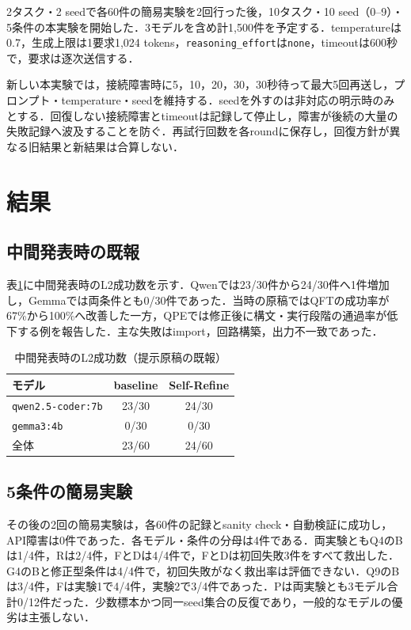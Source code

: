 \documentclass[a4paper,8pt,twocolumn]{extarticle}
\begin{document}
2タスク・2 seedで各60件の簡易実験を2回行った後，10タスク・10 seed（0--9）・5条件の本実験を開始した．3モデルを含め計1,500件を予定する．temperatureは0.7，生成上限は1要求1,024 tokens，\texttt{reasoning\_effort}は\texttt{none}，timeoutは600秒で，要求は逐次送信する．

新しい本実験では，接続障害時に5，10，20，30，30秒待って最大5回再送し，プロンプト・temperature・seedを維持する．seedを外すのは非対応の明示時のみとする．回復しない接続障害とtimeoutは記録して停止し，障害が後続の大量の失敗記録へ波及することを防ぐ．再試行回数を各roundに保存し，回復方針が異なる旧結果と新結果は合算しない．

\section{結果}
\subsection{中間発表時の既報}
表\ref{tab:legacy}に中間発表時のL2成功数を示す．Qwenでは23/30件から24/30件へ1件増加し，Gemmaでは両条件とも0/30件であった．当時の原稿ではQFTの成功率が67\%から100\%へ改善した一方，QPEでは修正後に構文・実行段階の通過率が低下する例を報告した．主な失敗はimport，回路構築，出力不一致であった．
\begin{table}[t]
\centering
\caption{中間発表時のL2成功数（提示原稿の既報）}
\label{tab:legacy}
\begin{tabular}{lcc}
\hline
モデル & baseline & Self-Refine \\
\hline
\texttt{qwen2.5-coder:7b} & 23/30 & 24/30 \\
\texttt{gemma3:4b} & 0/30 & 0/30 \\
全体 & 23/60 & 24/60 \\
\hline
\end{tabular}
\end{table}

\subsection{5条件の簡易実験}
その後の2回の簡易実験は，各60件の記録とsanity check・自動検証に成功し，API障害は0件であった．各モデル・条件の分母は4件である．両実験ともQ4のBは1/4件，Rは2/4件，FとDは4/4件で，FとDは初回失敗3件をすべて救出した．G4のBと修正型条件は4/4件で，初回失敗がなく救出率は評価できない．Q9のBは3/4件，Fは実験1で4/4件，実験2で3/4件であった．Pは両実験とも3モデル合計0/12件だった．少数標本かつ同一seed集合の反復であり，一般的なモデルの優劣は主張しない．
\end{document}
